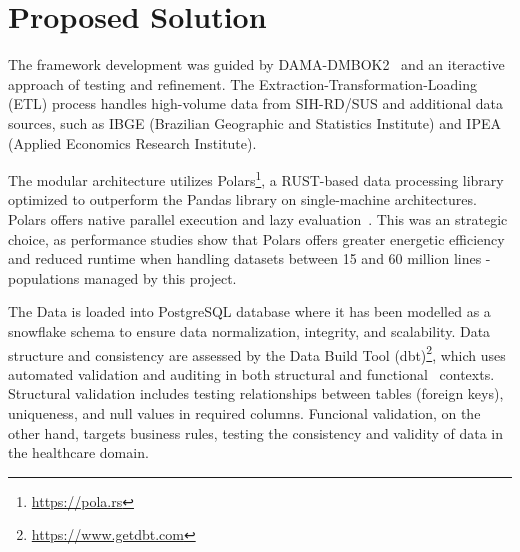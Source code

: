 \documentclass[sigconf,natbib=false]{acmart}
\begin{document}
\section{Proposed Solution}
\label{sec:solution}

The framework development was guided by DAMA-DMBOK2~\cite{dama2017} and an iteractive approach of testing and refinement.
The Extraction-Transformation-Loading (ETL) process handles high-volume data from SIH-RD/SUS and additional data sources, such as IBGE (Brazilian Geographic and Statistics Institute) and IPEA (Applied Economics Research Institute).


The modular architecture utilizes Polars\footnote{\url{https://pola.rs}}, a RUST-based data processing library optimized to outperform the Pandas library on single-machine architectures.
Polars offers native parallel execution and lazy evaluation~\cite{2024polars}.
This was an strategic choice, as performance studies show that Polars offers greater energetic efficiency and reduced runtime when handling datasets between 15 and 60 million lines - populations managed by this project.


The Data is loaded into PostgreSQL database where it has been modelled as a snowflake schema to ensure data normalization, integrity, and scalability.
Data structure and consistency are assessed by the Data Build Tool (dbt)\footnote{\url{https://www.getdbt.com}}, which uses automated validation and auditing in both structural and functional~\cite{senthil2025} contexts.
Structural validation includes testing relationships between tables (foreign keys), uniqueness, and null values in required columns. Funcional validation, on the other hand, targets business rules, testing the consistency and validity of data in the healthcare domain.
\end{document}
